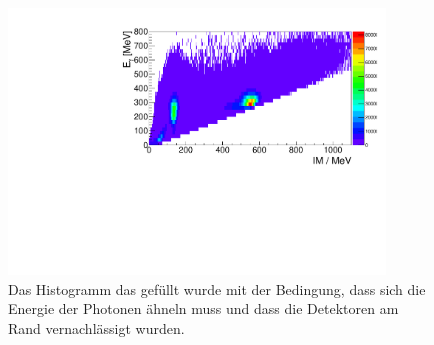 \documentclass[a4paper,11pt,oneside,final,german,openbib,pdftex]{scrbook}
\begin{document}
{\begin{appendix}

\begin{figure}[h!]
	\begin{center}
		\includegraphics[width=100mm]{NewCalib/Strahlzeit2014/20171904Real30DegreeCutHist}
		\caption[Strahlzeit: 2D-Hist ohne Detektoren am Rand]{Das Histogramm das gef\"ullt wurde mit der Bedingung, dass sich die Energie der Photonen \"ahneln muss und dass die Detektoren am Rand vernachl\"assigt wurden.}
		\label{fig:30-Degree-Cut-Histogramm}
	\end{center}
\end{figure}



\end{appendix}}
\end{document}
